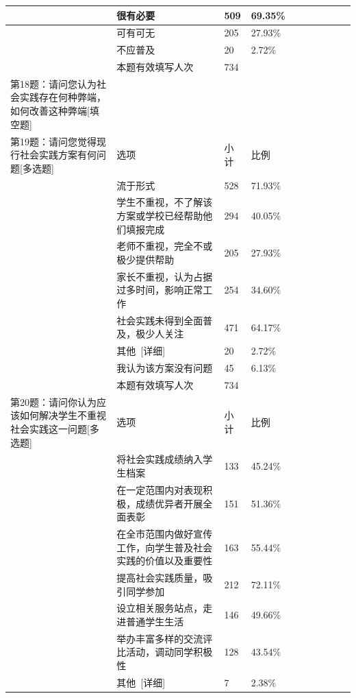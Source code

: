\documentclass[12pt,UTF8]{ctexart}
\begin{document}
{\begin{spacing}{01}
\begin{longtable}{p{3.5cm}p{2cm}p{1.5cm}p{1.5cm}p{1.5cm}p{1.5cm}p{1.5cm}p{1cm}}
			~ & 很有必要 & 509 & 69.35\% & ~ & ~ & ~ & ~ \\ \hline
			~ & 可有可无 & 205 & 27.93\% & ~ & ~ & ~ & ~ \\ \hline
			~ & 不应普及 & 20 & 2.72\% & ~ & ~ & ~ & ~ \\ \hline
			~ & 本题有效填写人次 & 734 & ~ & ~ & ~ & ~ & ~ \\ \hline
			第18题：请问您认为社会实践存在何种弊端，如何改善这种弊端[填空题] & ~ & ~ & ~ & ~ & ~ & ~ & ~ \\ \hline
			第19题：请问您觉得现行社会实践方案有何问题[多选题] & 选项 & 小计 & 比例 & ~ & ~ & ~ & ~ \\ \hline
			~ & 流于形式 & 528 & 71.93\% & ~ & ~ & ~ & ~ \\ \hline
			~ & 学生不重视，不了解该方案或学校已经帮助他们填报完成 & 294 & 40.05\% & ~ & ~ & ~ & ~ \\ \hline
			~ & 老师不重视，完全不或极少提供帮助 & 205 & 27.93\% & ~ & ~ & ~ & ~ \\ \hline
			~ & 家长不重视，认为占据过多时间，影响正常工作 & 254 & 34.60\% & ~ & ~ & ~ & ~ \\ \hline
			~ & 社会实践未得到全面普及，极少人关注 & 471 & 64.17\% & ~ & ~ & ~ & ~ \\ \hline
			~ & 其他 [详细] & 20 & 2.72\% & ~ & ~ & ~ & ~ \\ \hline
			~ & 我认为该方案没有问题 & 45 & 6.13\% & ~ & ~ & ~ & ~ \\ \hline
			~ & 本题有效填写人次 & 734 & ~ & ~ & ~ & ~ & ~ \\ \hline
			第20题：请问你认为应该如何解决学生不重视社会实践这一问题[多选题] & 选项 & 小计 & 比例 & ~ & ~ & ~ & ~ \\ \hline
			~ & 将社会实践成绩纳入学生档案 & 133 & 45.24\% & ~ & ~ & ~ & ~ \\ \hline
			~ & 在一定范围内对表现积极，成绩优异者开展全面表彰 & 151 & 51.36\% & ~ & ~ & ~ & ~ \\ \hline
			~ & 在全市范围内做好宣传工作，向学生普及社会实践的价值以及重要性 & 163 & 55.44\% & ~ & ~ & ~ & ~ \\ \hline
			~ & 提高社会实践质量，吸引同学参加 & 212 & 72.11\% & ~ & ~ & ~ & ~ \\ \hline
			~ & 设立相关服务站点，走进普通学生生活 & 146 & 49.66\% & ~ & ~ & ~ & ~ \\ \hline
			~ & 举办丰富多样的交流评比活动，调动同学积极性 & 128 & 43.54\% & ~ & ~ & ~ & ~ \\ \hline
			~ & 其他 [详细] & 7 & 2.38\% & ~ & ~ & ~ & ~ \\ \hline

\end{longtable}
\end{spacing}}
\end{document}
